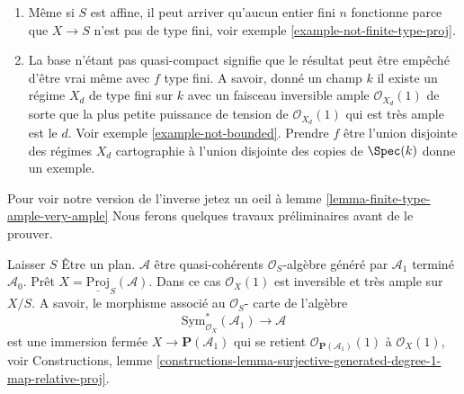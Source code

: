 \begin{enumerate}

\item Même si $S$ est affine, il peut arriver qu'aucun entier fini
$n$ fonctionne parce que $X \to S$ n'est pas de type fini, voir exemple \ref{example-not-finite-type-proj}.
\item La base n'étant pas quasi-compact signifie que le résultat peut être empêché d'être vrai même avec $f$ type fini. A savoir, donné un champ $k$ il existe un régime $X_d$ de type fini sur $k$ avec un faisceau inversible ample $\mathcal{O}_{X_d}(1)$ de sorte que la plus petite puissance de tension de $\mathcal{O}_{X_d}(1)$ qui est très ample est le $d$. Voir exemple \ref{example-not-bounded}. Prendre $f$ être l'union disjointe des régimes $X_d$ cartographie à l'union disjointe des copies de $\Spec(k)$ donne un exemple.

\end{enumerate}

Pour voir notre version de l'inverse jetez un oeil à lemme \ref{lemma-finite-type-ample-very-ample} Nous ferons quelques travaux préliminaires avant de le prouver.

\begin{example}

\label{example-very-ample}

Laisser $S$ Être un plan. $\mathcal{A}$ être quasi-cohérents
$\mathcal{O}_S$-algèbre généré par $\mathcal{A}_1$ terminé $\mathcal{A}_0$. Prêt $X = \underline{\text{Proj}}_S(\mathcal{A})$. Dans ce cas
$\mathcal{O}_X(1)$ est inversible et très ample sur $X/S$. A savoir, le morphisme associé au $\mathcal{O}_S$- carte de l'algèbre
$$
\text{Sym}_{\mathcal{O}_X}^*(\mathcal{A}_1)
\longrightarrow
\mathcal{A}
$$
est une immersion fermée $X \to \mathbf{P}(\mathcal{A}_1)$ qui se retient
$\mathcal{O}_{\mathbf{P}(\mathcal{A}_1)}(1)$ à $\mathcal{O}_X(1)$, voir Constructions, lemme
\ref{constructions-lemma-surjective-generated-degree-1-map-relative-proj}.

\end{example}


